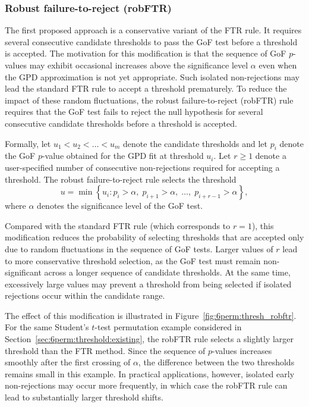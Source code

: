 \subsubsection*{Robust failure-to-reject (robFTR)}

The first proposed approach is a conservative variant of the FTR rule. It requires several consecutive candidate thresholds to pass the GoF test before a threshold is accepted. The motivation for this modification is that the sequence of GoF $p$-values may exhibit occasional increases above the significance level $\alpha$ even when the GPD approximation is not yet appropriate. Such isolated non-rejections may lead the standard FTR rule to accept a threshold prematurely.
To reduce the impact of these random fluctuations, the robust failure-to-reject (robFTR) rule requires that the GoF test fails to reject the null hypothesis for several consecutive candidate thresholds before a threshold is accepted.

Formally, let $u_1 < u_2 < \dots < u_m$ denote the candidate thresholds and let $p_i$ denote the GoF $p$-value obtained for the GPD fit at threshold $u_i$. Let $r \ge 1$ denote a user-specified number of consecutive non-rejections required for accepting a threshold. The robust failure-to-reject rule selects the threshold
\begin{equation}
\label{eq:6perm:thresh_robftr}
u =
\min \left\{
u_i :
p_i > \alpha,\;
p_{i+1} > \alpha,\;
\dots,\;
p_{i+r-1} > \alpha
\right\},
\end{equation}
where $\alpha$ denotes the significance level of the GoF test.

Compared with the standard FTR rule (which corresponds to $r=1$), this modification reduces the probability of selecting thresholds that are accepted only due to random fluctuations in the sequence of GoF tests. Larger values of $r$ lead to more conservative threshold selection, as the GoF test must remain non-significant across a longer sequence of candidate thresholds. At the same time, excessively large values may prevent a threshold from being selected if isolated rejections occur within the candidate range.

The effect of this modification is illustrated in Figure~\ref{fig:6perm:thresh_robftr}. 
For the same Student's $t$-test permutation example considered in Section~\ref{sec:6perm:threshold:existing}, the robFTR rule selects a slightly larger threshold than the FTR method. Since the sequence of $p$-values increases smoothly after the first crossing of $\alpha$, the difference between the two thresholds remains small in this example. In practical applications, however, isolated early non-rejections may occur more frequently, in which case the robFTR rule can lead to substantially larger threshold shifts.

